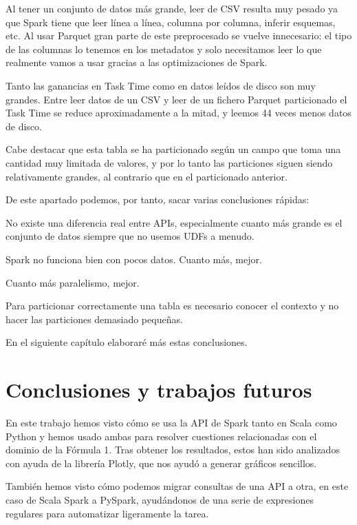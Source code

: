 \documentclass[12pt,twoside,titlepage]{report}
\begin{document}
Al tener un conjunto de datos más grande, leer de CSV resulta muy pesado ya que Spark tiene que leer línea a línea, columna por columna, inferir esquemas, etc. Al usar Parquet gran parte de este preprocesado se vuelve innecesario: el tipo de las columnas lo tenemos en los metadatos y solo necesitamos leer lo que realmente vamos a usar gracias a las optimizaciones de Spark. 

Tanto las ganancias en Task Time como en datos leídos de disco son muy grandes. Entre leer datos de un CSV y leer de un fichero Parquet particionado el Task Time se reduce aproximadamente a la mitad, y leemos 44 veces menos datos de disco.

Cabe destacar que esta tabla se ha particionado según un campo que toma una cantidad muy limitada de valores, y por lo tanto las particiones siguen siendo relativamente grandes, al contrario que en el particionado anterior.

De este apartado podemos, por tanto, sacar varias conclusiones rápidas: 

\begin{compactitem}
	\item No existe una diferencia real entre APIs, especialmente cuanto más grande es el conjunto de datos siempre que no usemos UDFs a menudo.
	\item Spark no funciona bien con pocos datos. Cuanto más, mejor.
	\item Cuanto más paralelismo, mejor.
	\item Para particionar correctamente una tabla es necesario conocer el contexto y no hacer las particiones demasiado pequeñas.
\end{compactitem}

En el siguiente capítulo elaboraré más estas conclusiones.



\chapter{Conclusiones y trabajos futuros}
\newpage

En este trabajo hemos visto cómo se usa la API de Spark tanto en Scala como Python y hemos usado ambas para resolver cuestiones relacionadas con el dominio de la Fórmula 1. Tras obtener los resultados, estos han sido analizados con ayuda de la librería Plotly, que nos ayudó a generar gráficos sencillos.

También hemos visto cómo podemos migrar consultas de una API a otra, en este caso de Scala Spark a PySpark, ayudándonos de una serie de expresiones regulares para automatizar ligeramente la tarea.
\end{document}
